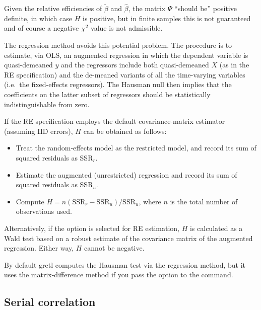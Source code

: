 Given the relative efficiencies of $\tilde{\beta}$ and $\hat{\beta}$,
the matrix $\Psi$ ``should be'' positive definite, in which case $H$
is positive, but in finite samples this is not guaranteed and of
course a negative $\chi^2$ value is not admissible.

The regression method avoids this potential problem. The procedure is
to estimate, via OLS, an augmented regression in which the dependent
variable is quasi-demeaned $y$ and the regressors include both
quasi-demeaned $X$ (as in the RE specification) and the de-meaned
variants of all the time-varying variables (i.e.\ the fixed-effects
regressors). The Hausman null then implies that the coefficients on
the latter subset of regressors should be statistically
indistinguishable from zero.

If the RE specification employs the default covariance-matrix
estimator (assuming IID errors), $H$ can be obtained as follows:
\begin{itemize}
\item Treat the random-effects model as the restricted model, and
  record its sum of squared residuals as SSR$_r$.
\item Estimate the augmented (unrestricted) regression and record its
  sum of squared residuals as SSR$_u$.
\item Compute $H = n \left(\mbox{SSR}_r - \mbox{SSR}_u\right) /
  \mbox{SSR}_u$, where $n$ is the total number of observations used.
\end{itemize}

Alternatively, if the  option is selected for RE
estimation, $H$ is calculated as a Wald test based on a robust
estimate of the covariance matrix of the augmented regression. Either
way, $H$ cannot be negative.

By default gretl computes the Hausman test via the regression
method, but it uses the matrix-difference method if you pass the
option  to the  command.

\subsection{Serial correlation}
\label{panel-autocorr}

